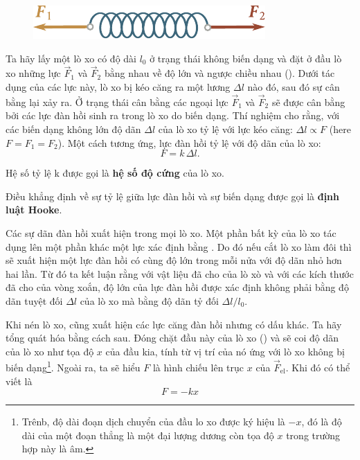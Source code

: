 \begin{figure}[!htb]
	\begin{center}
		\includegraphics[scale=1]{figures/ch_02/fig_2_4.pdf}
		\caption[]{}
		\label{fig:2_4}
	\end{center}
\end{figure}

Ta hãy lấy một lò xo có độ dài $l_0$ ở trạng thái không biến dạng và đặt ở đầu lò xo những lực $\vec{F}_1$ và $\vec{F}_2$ bằng nhau về độ lớn và ngược chiều nhau (). Dưới tác dụng của các lực này, lò xo bị kéo căng ra một lương $\Delta l$ nào đó, sau đó sự cân bằng lại xảy ra. Ở trạng thái cân bằng các ngoại lực $\vec{F}_1$ và $\vec{F}_2$ sẽ được cân bằng bởi các lực đàn hồi sinh ra trong lò xo do biến dạng. Thí nghiệm cho rằng, với các biến dạng không lớn độ dãn $\Delta l$ của lò xo tỷ lệ với lực kéo căng: $\Delta l\propto F$ (here $F=F_1=F_2$). Một cách tương ứng, lực đàn hồi tỷ lệ với độ dãn của lò xo:
\begin{equation}\label{eq:2_25}
F = k\,\Delta l.
\end{equation}

\noindent
Hệ số tỷ lệ k được gọi là \textbf{hệ số độ cứng} của lò xo.

Điều khẳng định về sự tỷ lệ giữa lực đàn hồi và sự biến dạng được gọi là \textbf{định luật Hooke}.

Các sự dãn đàn hồi xuất hiện trong mọi lò xo. Một phần bất kỳ của lò xo tác dụng lên một phần khác một lực xác định bằng . Do đó nếu cắt lò xo làm đôi thì sẽ xuất hiện một lực đàn hồi có cùng độ lớn trong mỗi nửa với độ dãn nhỏ hơn hai lần. Từ đó ta kết luận rằng với vật liệu đã cho của lò xò và với các kích thước đã cho của vòng xoắn, độ lớn của lực đàn hồi được xác định không phải bằng độ dãn tuyệt đối $\Delta l$ của lò xo mà bằng độ dãn tỷ đối $\Delta l/l_0$.

Khi nén lò xo, cũng xuất hiện các lực căng đàn hồi nhưng có dấu khác. Ta hãy tổng quát hóa  bằng cách sau. Đóng chặt đầu này của lò xo () và sẽ coi độ dãn của lò xo như tọa độ $x$ của đầu kia, tính từ vị trí của nó ứng với lò xo không bị biến dạng\footnote{Trênb, độ dài đoạn dịch chuyển của đầu lo xo được ký hiệu là $-x$, đó là độ dài của một đoạn thẳng là một đại lượng dương còn tọa độ $x$ trong trường hợp này là âm.}. Ngoài ra, ta sẽ hiểu $F$ là hình chiếu lên trục $x$ của $\vec{F}_{\text{el}}$. Khi đó có thể viết là
\begin{equation}\label{eq:2_26}
F = -k x
\end{equation}

